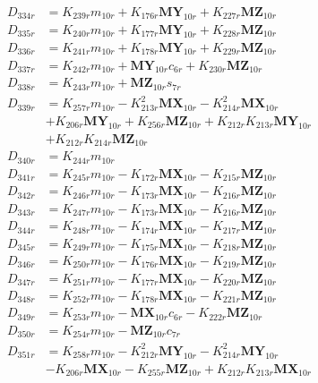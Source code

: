 \begin{multicols}{2}
\begin{align}
D_{334r} &= K_{239r}m_{10r} + K_{176r}\mathbf{MY}_{10r} + K_{227r}\mathbf{MZ}_{10r} \nonumber \\
D_{335r} &= K_{240r}m_{10r} + K_{177r}\mathbf{MY}_{10r} + K_{228r}\mathbf{MZ}_{10r} \nonumber \\
D_{336r} &= K_{241r}m_{10r} + K_{178r}\mathbf{MY}_{10r} + K_{229r}\mathbf{MZ}_{10r} \nonumber \\
D_{337r} &= K_{242r}m_{10r} + \mathbf{MY}_{10r}c_{6r} + K_{230r}\mathbf{MZ}_{10r} \nonumber \\
D_{338r} &= K_{243r}m_{10r} + \mathbf{MZ}_{10r}s_{7r} \nonumber \\
D_{339r} &= K_{257r}m_{10r} - K_{213r}^2\mathbf{MX}_{10r} - K_{214r}^2\mathbf{MX}_{10r}  \nonumber \\
&+ K_{206r}\mathbf{MY}_{10r} + K_{256r}\mathbf{MZ}_{10r} + K_{212r}K_{213r}\mathbf{MY}_{10r}  \nonumber \\
&+ K_{212r}K_{214r}\mathbf{MZ}_{10r} \nonumber \\
D_{340r} &= K_{244r}m_{10r} \nonumber \\
D_{341r} &= K_{245r}m_{10r} - K_{172r}\mathbf{MX}_{10r} - K_{215r}\mathbf{MZ}_{10r} \nonumber \\
D_{342r} &= K_{246r}m_{10r} - K_{173r}\mathbf{MX}_{10r} - K_{216r}\mathbf{MZ}_{10r} \nonumber \\
D_{343r} &= K_{247r}m_{10r} - K_{173r}\mathbf{MX}_{10r} - K_{216r}\mathbf{MZ}_{10r} \nonumber \\
D_{344r} &= K_{248r}m_{10r} - K_{174r}\mathbf{MX}_{10r} - K_{217r}\mathbf{MZ}_{10r} \nonumber \\
D_{345r} &= K_{249r}m_{10r} - K_{175r}\mathbf{MX}_{10r} - K_{218r}\mathbf{MZ}_{10r} \nonumber \\
D_{346r} &= K_{250r}m_{10r} - K_{176r}\mathbf{MX}_{10r} - K_{219r}\mathbf{MZ}_{10r} \nonumber \\
D_{347r} &= K_{251r}m_{10r} - K_{177r}\mathbf{MX}_{10r} - K_{220r}\mathbf{MZ}_{10r} \nonumber \\
D_{348r} &= K_{252r}m_{10r} - K_{178r}\mathbf{MX}_{10r} - K_{221r}\mathbf{MZ}_{10r} \nonumber \\
D_{349r} &= K_{253r}m_{10r} - \mathbf{MX}_{10r}c_{6r} - K_{222r}\mathbf{MZ}_{10r} \nonumber \\
D_{350r} &= K_{254r}m_{10r} - \mathbf{MZ}_{10r}c_{7r} \nonumber \\
D_{351r} &= K_{258r}m_{10r} - K_{212r}^2\mathbf{MY}_{10r} - K_{214r}^2\mathbf{MY}_{10r}  \nonumber \\
&- K_{206r}\mathbf{MX}_{10r} - K_{255r}\mathbf{MZ}_{10r} + K_{212r}K_{213r}\mathbf{MX}_{10r}  \nonumber \\

\end{align}
\end{multicols}
